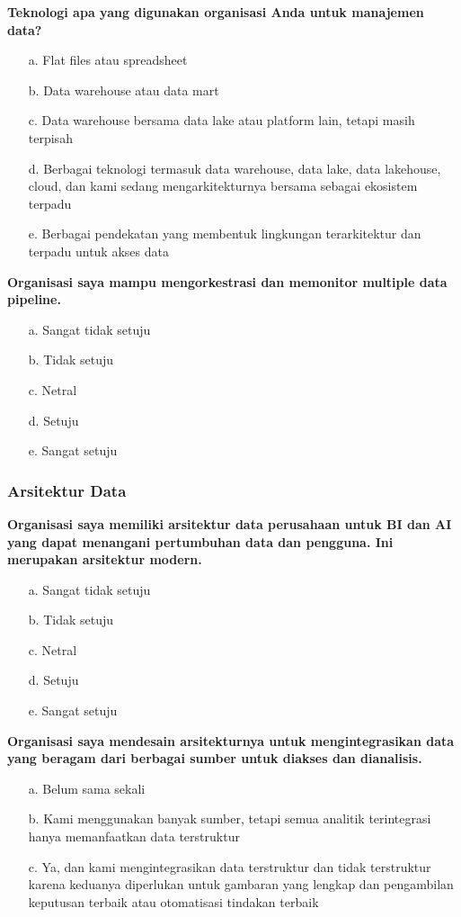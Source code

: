 \documentclass{article}
\begin{document}
\textbf{Teknologi apa yang digunakan organisasi Anda untuk manajemen data?}

\begin{enumerate}
	\item[a.] Flat files atau spreadsheet
	\item[b.] Data warehouse atau data mart
	\item[c.] Data warehouse bersama data lake atau platform lain, tetapi masih terpisah
	\item[d.] Berbagai teknologi termasuk data warehouse, data lake, data lakehouse, cloud, dan kami sedang mengarkitekturnya bersama sebagai ekosistem terpadu
	\item[e.] Berbagai pendekatan yang membentuk lingkungan terarkitektur dan terpadu untuk akses data
\end{enumerate}

\textbf{Organisasi saya mampu mengorkestrasi dan memonitor multiple data pipeline.}

\begin{enumerate}
	\item[a.] Sangat tidak setuju
	\item[b.] Tidak setuju
	\item[c.] Netral
	\item[d.] Setuju
	\item[e.] Sangat setuju
\end{enumerate}

\subsubsection{Arsitektur Data}

\textbf{Organisasi saya memiliki arsitektur data perusahaan untuk BI dan AI yang dapat menangani pertumbuhan data dan pengguna. Ini merupakan arsitektur modern.}

\begin{enumerate}
	\item[a.] Sangat tidak setuju
	\item[b.] Tidak setuju
	\item[c.] Netral
	\item[d.] Setuju
	\item[e.] Sangat setuju
\end{enumerate}

\textbf{Organisasi saya mendesain arsitekturnya untuk mengintegrasikan data yang beragam dari berbagai sumber untuk diakses dan dianalisis.}

\begin{enumerate}
	\item[a.] Belum sama sekali
	\item[b.] Kami menggunakan banyak sumber, tetapi semua analitik terintegrasi hanya memanfaatkan data terstruktur
	\item[c.] Ya, dan kami mengintegrasikan data terstruktur dan tidak terstruktur karena keduanya diperlukan untuk gambaran yang lengkap dan pengambilan keputusan terbaik atau otomatisasi tindakan terbaik
\end{enumerate}
\end{document}
